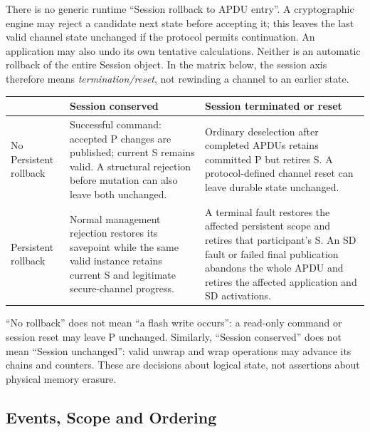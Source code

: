 There is no generic runtime ``Session rollback to APDU entry''. A
cryptographic engine may reject a candidate next state before accepting it;
this leaves the last valid channel state unchanged if the protocol permits
continuation. An application may also undo its own tentative calculations.
Neither is an automatic rollback of the entire Session object. In the
matrix below, the session axis therefore means \emph{termination/reset},
not rewinding a channel to an earlier state.

\begin{center}
\small
\renewcommand{\arraystretch}{1.25}
\begin{tabular}{|>{\raggedright\arraybackslash}p{2.7cm}|>{\raggedright\arraybackslash}p{5.4cm}|>{\raggedright\arraybackslash}p{5.4cm}|}
\hline
 & Session conserved & Session terminated or reset \\
\hline
No Persistent rollback &
Successful command: accepted P changes are published; current S remains
valid. A structural rejection before mutation can also leave both unchanged. &
Ordinary deselection after completed APDUs retains committed P but retires S.
A protocol-defined channel reset can leave durable state unchanged. \\
\hline
Persistent rollback &
Normal management rejection restores its savepoint while the same valid
instance retains current S and legitimate secure-channel progress. &
A terminal fault restores the affected persistent scope and retires that
participant's S. An SD fault or failed final publication abandons the whole
APDU and retires the affected application and SD activations. \\
\hline
\end{tabular}
\end{center}

``No rollback'' does not mean ``a flash write occurs'': a read-only command
or session reset may leave P unchanged. Similarly, ``Session conserved''
does not mean ``Session unchanged'': valid unwrap and wrap operations may
advance its chains and counters. These are decisions about logical state,
not assertions about physical memory erasure.

\subsection{Events, Scope and Ordering}

